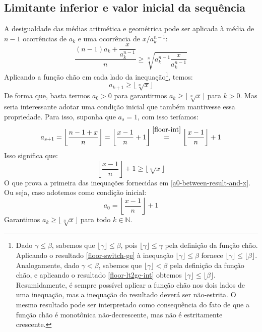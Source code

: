 \subsection*{Limitante inferior e valor inicial da sequência}

A desigualdade das médias aritmética e geométrica
pode ser aplicada à média de $n - 1$ ocorrências de $a_k$
e uma ocorrência de $x/a_k^{n-1}$:
\[
  \dfrac{(n-1) a_k + \dfrac{x}{a_k^{n-1}}}{n} \ge
  \sqrt[n]{a_k^{n-1} \dfrac{x}{a_k^{n-1}}}
\]
Aplicando a função chão em cada lado da inequação\footnote{
  Dado $\gamma \le \beta$, sabemos que
  $\lfloor \gamma \rfloor \le \beta$,
  pois $\lfloor \gamma \rfloor \le \gamma$
  pela definição da função chão.
  Aplicando o resultado \eqref{floor-switch-ge}
  à inequação $\lfloor \gamma \rfloor \le \beta$
  fornece $\lfloor \gamma \rfloor \le \lfloor \beta \rfloor$.
  Analogamente, dado $\gamma < \beta$,
  sabemos que $\lfloor \gamma \rfloor < \beta$
  pela definição da função chão,
  e aplicando o resultado \eqref{floor-lt2ge-int}
  obtemos $\lfloor \gamma \rfloor \le \lfloor \beta \rfloor$.
  Resumidamente,
  é sempre possível aplicar a função chão
  nos dois lados de uma inequação,
  mas a inequação do resultado deverá ser não-estrita.
  O mesmo resultado pode ser interpretado
  como consequência do fato
  de que a função chão é monotônica não-decrescente,
  mas não é estritamente crescente.
},
temos:
\begin{equation}\label{amgm-min-ak+1}
  a_{k+1} \ge \lfloor \sqrt[n]{x} \rfloor
\end{equation}
De forma que, basta termos $a_0 > 0$
para garantirmos $a_k \ge \lfloor \sqrt[n]{x} \rfloor$ para $k > 0$.
Mas seria interessante adotar uma condição inicial
que também mantivesse essa propriedade.
Para isso, suponha que $a_s = 1$, com isso teríamos:
\[
  a_{s+1}
  = \left\lfloor \dfrac{n - 1 + x}{n} \right\rfloor
  = \left\lfloor \dfrac{x - 1}{n} + 1 \right\rfloor
  \stackfirst{\eqref{floor-int}}{=}
    \left\lfloor \dfrac{x - 1}{n} \right\rfloor + 1
\]
Isso significa que:
\begin{equation}\label{a0-not-below-result}
  \left\lfloor \dfrac{x - 1}{n} \right\rfloor + 1
  \ge \lfloor \sqrt[n]{x} \rfloor
\end{equation}
O que prova a primeira das inequações
fornecidas em \eqref{a0-between-result-and-x}.
Ou seja, caso adotemos como condição inicial:
\[
  a_0 = \left\lfloor \dfrac{x - 1}{n} \right\rfloor + 1
\]
Garantimos $a_k \ge \lfloor \sqrt[n]{x} \rfloor$
para todo $k \in \mathds{N}$.
